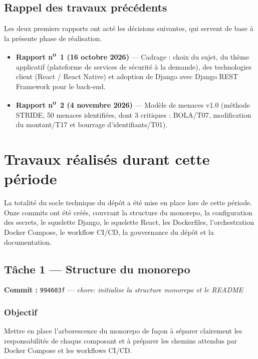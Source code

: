 \documentclass[11pt,a4paper]{article}
\begin{document}
\subsection{Rappel des travaux précédents}

Les deux premiers rapports ont acté les décisions suivantes, qui servent de base à la présente
phase de réalisation.

\begin{itemize}
  \item \textbf{Rapport n\textsuperscript{o}~1 (16 octobre 2026)} --- Cadrage : choix du sujet,
    du thème applicatif (plateforme de services de sécurité à la demande), des technologies
    client (React / React Native) et adoption de Django avec Django REST Framework pour le
    back-end.
  \item \textbf{Rapport n\textsuperscript{o}~2 (4 novembre 2026)} --- Modèle de menaces v1.0
    (méthode STRIDE, 50 menaces identifiées, dont 3 critiques : BOLA/T07, modification du
    montant/T17 et bourrage d'identifiants/T01).
\end{itemize}

\section{Travaux réalisés durant cette période}

La totalité du socle technique du dépôt a été mise en place lors de cette période. Onze commits
ont été créés, couvrant la structure du monorepo, la configuration des secrets, le squelette
Django, le squelette React, les Dockerfiles, l'orchestration Docker Compose, le workflow
CI/CD, la gouvernance du dépôt et la documentation.

\subsection{Tâche 1 --- Structure du monorepo}

\textbf{Commit :} \texttt{994603f} --- \textit{chore: initialise la structure monorepo et le README}

\subsubsection*{Objectif}

Mettre en place l'arborescence du monorepo de façon à séparer clairement les responsabilités
de chaque composant et à préparer les chemins attendus par Docker Compose et les workflows CI/CD.
\end{document}
